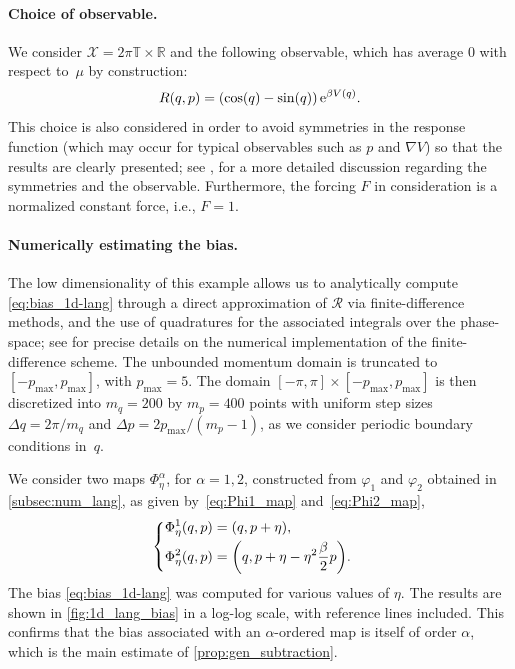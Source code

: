 \documentclass[11pt]{article}
\newcommand{\T}{\mathbb{T}}
\newcommand{\R}{\mathbb{R}}
\newcommand{\e}{\mathrm{e}}
\DeclarePairedDelimiter\paren{\lparen}{\rparen}
\theoremstyle{definition}
\let\oldparagraph=\paragraph
\renewcommand\paragraph[1]{\oldparagraph{#1.}}
\begin{document}
\paragraph{Choice of observable} We consider $\mathcal{X} = 2\pi \T \times \R$ and the following observable, which has average 0 with respect to~$\mu$ by construction: 
\begin{equation}
    \notag
	R(q,p) = \paren*{\cos(q) - \sin(q)} \, \e^{\beta V(q)}.
	\label{eq:R_observable}
\end{equation}
This choice is also considered in order to avoid symmetries in the response function (which may occur for typical observables such as $p$ and $\nabla V$) so that the results are clearly presented; see \cite[Section~4.2]{spacek2023}, for a more detailed discussion regarding the symmetries and the observable. Furthermore, the forcing $F$ in consideration is a normalized constant force, i.e., $F = 1$.

\paragraph{Numerically estimating the bias} The low dimensionality of this example allows us to analytically compute \eqref{eq:bias_1d-lang} through a direct approximation of $\mathcal{R}$ via finite-difference methods, and the use of quadratures for the associated integrals over the phase-space; see \cite[Appendix B]{spacek2023} for precise details on the numerical implementation of the finite-difference scheme. The unbounded momentum domain is truncated to $[-p_\mathrm{max},p_\mathrm{max}]$, with $p_\mathrm{max} = 5$. The domain $[-\pi,\pi] \times [-p_\mathrm{max},p_\mathrm{max}]$ is then discretized into $m_q = 200$ by $m_p = 400$ points with uniform step sizes $\Delta q = 2\pi/m_q$ and $\Delta p = 2p_\mathrm{max}/(m_p-1)$, as we consider periodic boundary conditions in~$q$.

We consider two maps $\Phi_\eta^\alpha$, for $\alpha=1,2$, constructed from $\varphi_1$ and $\varphi_2$ obtained in \cref{subsec:num_lang}, as given by~\eqref{eq:Phi1_map} and~\eqref{eq:Phi2_map},
\begin{equation}
    \notag
\begin{cases}
\begin{aligned}
	&\Phi_\eta^1(q,p) = (q, p + \eta), \\
	&\Phi_\eta^2(q,p) = \paren[\bigg]{q, p + \eta - \eta^2\frac{\beta}{2}p}.
\end{aligned}
\end{cases}
\end{equation}
The bias \eqref{eq:bias_1d-lang} was computed for various values of $\eta$. The results are shown in \cref{fig:1d_lang_bias} in a log-log scale, with reference lines included. This confirms that the bias associated with an $\alpha$-ordered map is itself of order $\alpha$, which is the main estimate of \cref{prop:gen_subtraction}.
\end{document}
